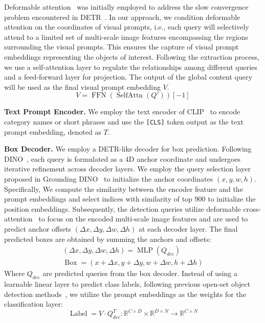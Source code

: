 Deformable attention~\cite{zhu2020deformable} was initially employed to address the slow convergence problem encountered in DETR~\cite{carion2020end}. In our approach, we condition deformable attention on the coordinates of visual prompts, i.e., each query will selectively attend to a limited set of multi-scale image features encompassing the regions surrounding the visual prompts. This ensures the capture of visual prompt embeddings representing the objects of interest. Following the extraction process, we use a self-attention layer to regulate the relationships among different queries and a feed-forward layer for projection. The output of the global content query will be used as the final visual prompt embedding $V$.
\begin{equation}
    V=\operatorname{FFN}(\operatorname{SelfAttn}(Q'))[-1]
\end{equation}

\noindent\textbf{Text Prompt Encoder.} We employ the text encoder of CLIP~\cite{clip} to encode category names or short phrases and use the \texttt{[CLS]} token output as the text prompt embedding, denoted as $T$. 

\noindent\textbf{Box Decoder.} We employ a DETR-like decoder for box prediction. Following DINO~\cite{zhang2022dino}, each query is formulated as a 4D anchor coordinate and undergoes iterative refinement across decoder layers. We employ the query selection layer proposed in Grounding DINO~\cite{liu2023grounding} to initialize the anchor coordinates $(x, y, w, h)$. Specifically, We compute the similarity between the encoder feature and the prompt embeddings and select indices with similarity of top 900 to initialize the position embeddings. Subsequently, the detection queries utilize deformable cross-attention~\cite{zhu2020deformable} to focus on the encoded multi-scale image features and are used to predict anchor offsets $(\Delta x, \Delta y, \Delta w, \Delta h)$ at each decoder layer. The final predicted boxes are obtained by summing the anchors and offsets:
\begin{gather}
    (\Delta x, \Delta y, \Delta w, \Delta h) = \operatorname{MLP}(Q_{dec}) \\
    \operatorname{Box} = (x+\Delta x, y+\Delta y, w+\Delta w, h+\Delta h)
\end{gather}
Where $Q_{dec}$ are predicted queries from the box decoder. Instead of using a learnable linear layer to predict class labels, following previous open-set object detection methods~\cite{li2022grounded, liu2023grounding}, we utilize the prompt embeddings as the weights for the classification layer:
\begin{equation}
    \operatorname{Label} = V \cdot Q_{dec}^T : \mathbb{R}^{C \times D} \times \mathbb{R}^{D \times N}  \rightarrow \mathbb{R}^{C \times N}
\end{equation}

